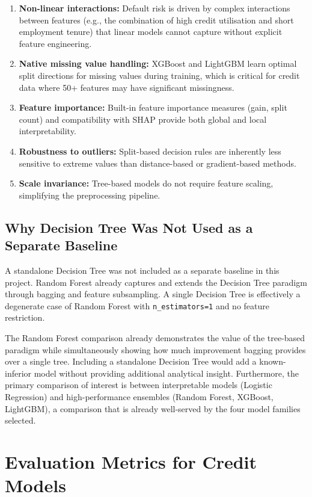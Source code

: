 \begin{enumerate}
    \item \textbf{Non-linear interactions:} Default risk is driven by complex interactions between features (e.g., the combination of high credit utilisation and short employment tenure) that linear models cannot capture without explicit feature engineering.
    \item \textbf{Native missing value handling:} XGBoost and LightGBM learn optimal split directions for missing values during training, which is critical for credit data where 50+ features may have significant missingness.
    \item \textbf{Feature importance:} Built-in feature importance measures (gain, split count) and compatibility with SHAP provide both global and local interpretability.
    \item \textbf{Robustness to outliers:} Split-based decision rules are inherently less sensitive to extreme values than distance-based or gradient-based methods.
    \item \textbf{Scale invariance:} Tree-based models do not require feature scaling, simplifying the preprocessing pipeline.
\end{enumerate}

\subsection{Why Decision Tree Was Not Used as a Separate Baseline}
\label{subsec:no_decision_tree}

A standalone Decision Tree was not included as a separate baseline in this project. Random Forest already captures and extends the Decision Tree paradigm through bagging and feature subsampling. A single Decision Tree is effectively a degenerate case of Random Forest with \texttt{n\_estimators=1} and no feature restriction.

The Random Forest comparison already demonstrates the value of the tree-based paradigm while simultaneously showing how much improvement bagging provides over a single tree. Including a standalone Decision Tree would add a known-inferior model without providing additional analytical insight. Furthermore, the primary comparison of interest is between interpretable models (Logistic Regression) and high-performance ensembles (Random Forest, XGBoost, LightGBM), a comparison that is already well-served by the four model families selected.

\section{Evaluation Metrics for Credit Models}
\label{sec:evaluation_metrics}

